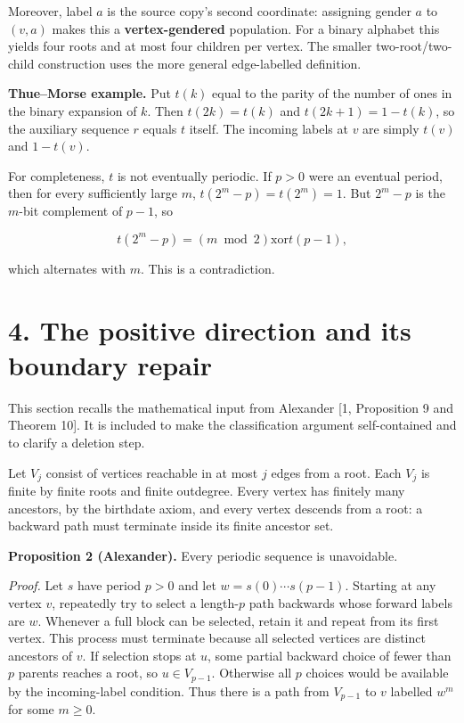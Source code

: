 \documentclass[
  11pt,
]{article}
\begin{document}
Moreover, label \(a\) is the source copy's second coordinate: assigning
gender \(a\) to \((v,a)\) makes this a \textbf{vertex-gendered}
population. For a binary alphabet this yields four roots and at most
four children per vertex. The smaller two-root/two-child construction
uses the more general edge-labelled definition.

\textbf{Thue--Morse example.} Put \(t(k)\) equal to the parity of the
number of ones in the binary expansion of \(k\). Then \(t(2k)=t(k)\) and
\(t(2k+1)=1-t(k)\), so the auxiliary sequence \(r\) equals \(t\) itself.
The incoming labels at \(v\) are simply \(t(v)\) and \(1-t(v)\).

For completeness, \(t\) is not eventually periodic. If \(p>0\) were an
eventual period, then for every sufficiently large \(m\),
\(t(2^m-p)=t(2^m)=1\). But \(2^m-p\) is the \(m\)-bit complement of
\(p-1\), so

\[t(2^m-p)=(m\bmod2)\mathbin{\mathrm{xor}}t(p-1),\]

which alternates with \(m\). This is a contradiction.

\section{4. The positive direction and its boundary
repair}\label{the-positive-direction-and-its-boundary-repair}

This section recalls the mathematical input from Alexander {[}1,
Proposition 9 and Theorem 10{]}. It is included to make the
classification argument self-contained and to clarify a deletion step.

Let \(V_j\) consist of vertices reachable in at most \(j\) edges from a
root. Each \(V_j\) is finite by finite roots and finite outdegree. Every
vertex has finitely many ancestors, by the birthdate axiom, and every
vertex descends from a root: a backward path must terminate inside its
finite ancestor set.

\textbf{Proposition 2 (Alexander).} Every periodic sequence is
unavoidable.

\emph{Proof.} Let \(s\) have period \(p>0\) and let
\(w=s(0)\cdots s(p-1)\). Starting at any vertex \(v\), repeatedly try to
select a length-\(p\) path backwards whose forward labels are \(w\).
Whenever a full block can be selected, retain it and repeat from its
first vertex. This process must terminate because all selected vertices
are distinct ancestors of \(v\). If selection stops at \(u\), some
partial backward choice of fewer than \(p\) parents reaches a root, so
\(u\in V_{p-1}\). Otherwise all \(p\) choices would be available by the
incoming-label condition. Thus there is a path from \(V_{p-1}\) to \(v\)
labelled \(w^m\) for some \(m\ge0\).
\end{document}
